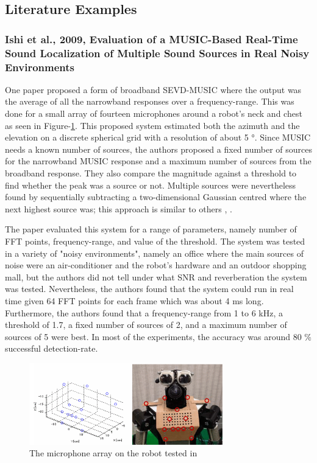 \documentclass[notitlepage]{report}
\begin{document}
\subsection{Literature Examples}

\subsubsection{Ishi et al., 2009, Evaluation of a MUSIC-Based Real-Time Sound Localization of Multiple Sound Sources in Real Noisy Environments}

One paper \cite{ishi_evaluation_2009} proposed a form of broadband SEVD-MUSIC where the output was the average of all the narrowband responses over a frequency-range. This was done for a small array of fourteen microphones around a robot's neck and chest as seen in Figure-\ref{fig:ishi_2009_array}. This proposed system estimated both the azimuth and the elevation on a discrete spherical grid with a resolution of about 5 \si{\degree}. Since MUSIC needs a known number of sources, the authors proposed a fixed number of sources for the narrowband MUSIC response and a maximum number of sources from the broadband response. They also compare the magnitude against a threshold to find whether the peak was a source or not. Multiple sources were nevertheless found by sequentially subtracting a two-dimensional Gaussian centred where the next highest source was; this approach is similar to others \cite{brutti_multiple_2010}, \cite{basiri_-board_2016}. 

The paper evaluated this system for a range of parameters, namely number of FFT points, frequency-range, and value of the threshold. The system was tested in a variety of "noisy environments", namely an office where the main sources of noise were an air-conditioner and the robot's hardware and an outdoor shopping mall, but the authors did not tell under what SNR and reverberation the system was tested. Nevertheless, the authors found that the system could run in real time given 64 FFT points for each frame which was about 4 \si{ms} long. Furthermore, the authors found that a frequency-range from 1 to 6 \si{kHz}, a threshold of 1.7, a fixed number of sources of 2, and a maximum number of sources of 5 were best. In most of the experiments, the accuracy was around 80 \% successful detection-rate.

\begin{figure}[H]
\includegraphics[width=0.75\textwidth]{./ishi_2009/array.png}
\centering
\caption{The microphone array on the robot tested in \cite{ishi_evaluation_2009}}
\label{fig:ishi_2009_array}
\centering
\end{figure}
\end{document}
